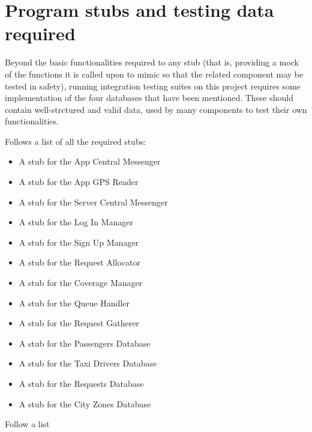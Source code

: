 \chapter{Program stubs and testing data required}
Beyond the basic functionalities required to any stub (that is, providing a mock of the functions it is called upon to mimic so that the related component may be tested in safety), running integration testing suites on this project requires some implementation of the four databases that have been mentioned. These should contain well-strctured and valid data, used by many components to test their own functionalities.

Follows a list of all the required stubs:
\begin{itemize}					\item A stub for the App Central Messenger
							\item A stub for the App GPS Reader
							\item A stub for the Server Central Messenger
							\item A stub for the Log In Manager
							\item A stub for the Sign Up Manager
							\item A stub for the Request Allocator
							\item A stub for the Coverage Manager
							\item A stub for the Queue Handler
							\item A stub for the Request Gatherer
							\item A stub for the Passengers Database
							\item A stub for the Taxi Drivers Database
							\item A stub for the Requests Database
							\item A stub for the City Zones Database
							
\end{itemize}

Follow a list